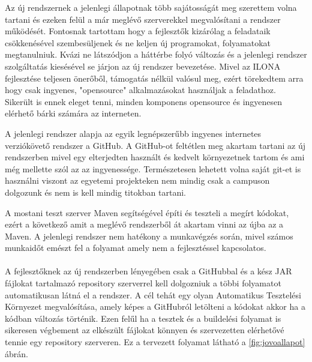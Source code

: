 Az új rendszernek a jelenlegi állapotnak több sajátosságát meg szerettem volna tartani és ezeken felül a már meglévő szerverekkel megvalósítani a rendszer működését. 
Fontosnak tartottam hogy a fejlesztők kizárólag a feladataik csökkenésével szembesüljenek és ne keljen új programokat, folyamatokat megtanulniuk. 
Kvázi ne látszódjon a háttérbe folyó változás és a jelenlegi rendszer szolgáltatás kiesésével se járjon az új rendszer bevezetése. 
Mivel az ILONA fejlesztése teljesen önerőből, támogatás nélkül valósul meg, ezért törekedtem arra hogy csak ingyenes, "opensource" alkalmazásokat használjak a feladathoz. 
Sikerült is ennek eleget tenni, minden komponens opensource és ingyenesen elérhető bárki számára az interneten.

A jelenlegi rendszer alapja az egyik legnépszerűbb ingyenes internetes verziókövető rendszer a GitHub. 
A GitHub-ot feltétlen meg akartam tartani az új rendszerben mivel egy elterjedten használt és kedvelt környezetnek tartom és ami még mellette szól az az ingyenessége. 
Természetesen lehetett volna saját git-et is használni viszont az egyetemi projekteken nem mindig csak a campuson dolgozunk és nem is kell mindig titokban tartani.

A mostani teszt szerver Maven segítségével építi és teszteli a megírt kódokat, ezért a következő amit a meglévő rendszerből át akartam vinni az újba az a Maven. 
A jelenlegi rendszer nem hatékony a munkavégzés során, mivel számos munkaidőt emészt fel a folyamat amely nem a fejlesztéssel kapcsolatos. 

\pagebreak
\paragraph{}
A fejlesztőknek az új rendszerben lényegében csak a GitHubbal és a kész JAR fájlokat tartalmazó repository szerverrel kell dolgozniuk a többi folyamatot automatikusan látná el a rendszer. 
A cél tehát egy olyan Automatikus Tesztelési Környezet megvalósítása, amely képes a GitHubról letölteni a kódokat akkor ha a kódban változás történik. 
Ezen felűl ha a tesztek és a buildelési folyamat is sikeresen végbement az elkészült fájlokat könnyen és szervezetten elérhetővé tennie egy repository szerveren. 
Ez a tervezett folyamat látható a \ref{fig:jovoallapot} ábrán. 


